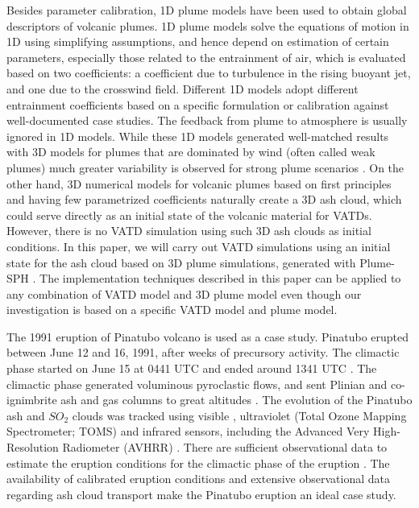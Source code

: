 \documentclass[utf8]{frontiersSCNS} %
\begin{document}
Besides parameter calibration, 1D plume models have been used to obtain global descriptors of volcanic plumes. 1D plume models \citep [e.g.][]{woods1988fluid, bursik2001effect, mastin2007user, de2015plume, folch2016fplume, pouget2016sensitivity} solve the equations of motion in 1D using simplifying assumptions, and hence depend on estimation of certain parameters, especially those related to the entrainment of air, which is evaluated based on two coefficients: a coefficient due to turbulence in the rising buoyant jet, and one due to the crosswind field. Different 1D models adopt different entrainment coefficients based on a specific formulation or calibration against well-documented case studies. The feedback from plume to atmosphere is usually ignored in 1D models. While these 1D models generated well-matched results with 3D models for plumes that are dominated by wind (often called weak plumes) much greater variability is observed for strong plume scenarios \citep{bursik2009volcanic, costa2016results}. On the other hand, 3D numerical models for volcanic plumes based on first principles and having few parametrized coefficients \citep{oberhuber1998volcanic, neri2003multiparticle, suzuki2005numerical, cerminara2016ashee, cao2018plume} naturally create a 3D ash cloud, which could serve directly as an initial state of the volcanic material for VATDs. However, there is no VATD simulation using such 3D ash clouds as initial conditions. In this paper, we will carry out VATD simulations using an initial state for the ash cloud based on 3D plume simulations, generated with Plume-SPH \citep{cao2018plume, cao2017data}. The implementation techniques described in this paper can be applied to any combination of VATD model and 3D plume model even though our investigation is based on a specific VATD model and plume model.

The 1991 eruption of Pinatubo volcano is used as a case study. Pinatubo erupted between June 12 and 16, 1991, after weeks of precursory activity. The climactic phase started on June 15 at 0441 UTC and ended around 1341 UTC \citep{holasek1996satellite}. The climactic phase generated voluminous pyroclastic flows, and sent Plinian and co-ignimbrite ash and gas columns to great altitudes \citep{scott1996pyroclastic}. The evolution of the Pinatubo ash and $SO_2$ clouds was tracked using visible \citep{holasek1996satellite}, ultraviolet (Total Ozone Mapping Spectrometer; TOMS) \citep{guo2004re} and infrared sensors, including the Advanced Very High-Resolution Radiometer (AVHRR) \citep{guo2004particles}. There are sufficient observational data to estimate the eruption conditions for the climactic phase of the eruption \citep{suzuki2009three}. The availability of calibrated eruption conditions and extensive observational data regarding ash cloud transport make the Pinatubo eruption an ideal case study.
\end{document}
